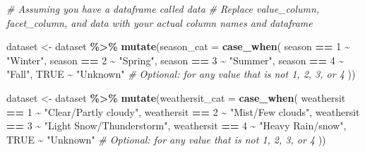 \documentclass[
]{article}
\newenvironment{Shaded}{\begin{snugshade}}{\end{snugshade}}
\newcommand{\AttributeTok}[1]{\textcolor[rgb]{0.13,0.29,0.53}{#1}}
\newcommand{\CommentTok}[1]{\textcolor[rgb]{0.56,0.35,0.01}{\textit{#1}}}
\newcommand{\ConstantTok}[1]{\textcolor[rgb]{0.56,0.35,0.01}{#1}}
\newcommand{\DecValTok}[1]{\textcolor[rgb]{0.00,0.00,0.81}{#1}}
\newcommand{\FunctionTok}[1]{\textcolor[rgb]{0.13,0.29,0.53}{\textbf{#1}}}
\newcommand{\NormalTok}[1]{#1}
\newcommand{\OtherTok}[1]{\textcolor[rgb]{0.56,0.35,0.01}{#1}}
\newcommand{\SpecialCharTok}[1]{\textcolor[rgb]{0.81,0.36,0.00}{\textbf{#1}}}
\newcommand{\StringTok}[1]{\textcolor[rgb]{0.31,0.60,0.02}{#1}}
\begin{document}
\begin{Shaded}
\begin{Highlighting}[]
\CommentTok{\# Assuming you have a dataframe called \textquotesingle{}data\textquotesingle{}}
\CommentTok{\# Replace \textquotesingle{}value\_column\textquotesingle{}, \textquotesingle{}facet\_column\textquotesingle{}, and \textquotesingle{}data\textquotesingle{} with your actual column names and dataframe}

\NormalTok{dataset }\OtherTok{\textless{}{-}}\NormalTok{ dataset }\SpecialCharTok{\%\textgreater{}\%}
  \FunctionTok{mutate}\NormalTok{(}\AttributeTok{season\_cat =} \FunctionTok{case\_when}\NormalTok{(}
\NormalTok{    season }\SpecialCharTok{==} \DecValTok{1} \SpecialCharTok{\textasciitilde{}} \StringTok{"Winter"}\NormalTok{,}
\NormalTok{    season }\SpecialCharTok{==} \DecValTok{2} \SpecialCharTok{\textasciitilde{}} \StringTok{"Spring"}\NormalTok{,}
\NormalTok{    season }\SpecialCharTok{==} \DecValTok{3} \SpecialCharTok{\textasciitilde{}} \StringTok{"Summer"}\NormalTok{,}
\NormalTok{    season }\SpecialCharTok{==} \DecValTok{4} \SpecialCharTok{\textasciitilde{}} \StringTok{"Fall"}\NormalTok{,}
    \ConstantTok{TRUE} \SpecialCharTok{\textasciitilde{}} \StringTok{"Unknown"}  \CommentTok{\# Optional: for any value that is not 1, 2, 3, or 4}
\NormalTok{  ))}

\NormalTok{dataset }\OtherTok{\textless{}{-}}\NormalTok{ dataset }\SpecialCharTok{\%\textgreater{}\%}
  \FunctionTok{mutate}\NormalTok{(}\AttributeTok{weathersit\_cat =} \FunctionTok{case\_when}\NormalTok{(}
\NormalTok{    weathersit }\SpecialCharTok{==} \DecValTok{1} \SpecialCharTok{\textasciitilde{}} \StringTok{"Clear/Partly cloudy"}\NormalTok{,}
\NormalTok{    weathersit }\SpecialCharTok{==} \DecValTok{2} \SpecialCharTok{\textasciitilde{}} \StringTok{"Mist/Few clouds"}\NormalTok{,}
\NormalTok{    weathersit }\SpecialCharTok{==} \DecValTok{3} \SpecialCharTok{\textasciitilde{}} \StringTok{"Light Snow/Thunderstorm"}\NormalTok{,}
\NormalTok{    weathersit }\SpecialCharTok{==} \DecValTok{4} \SpecialCharTok{\textasciitilde{}} \StringTok{"Heavy Rain/snow"}\NormalTok{,}
    \ConstantTok{TRUE} \SpecialCharTok{\textasciitilde{}} \StringTok{"Unknown"}  \CommentTok{\# Optional: for any value that is not 1, 2, 3, or 4}
\NormalTok{  ))}



\end{Highlighting}
\end{Shaded}
\end{document}
